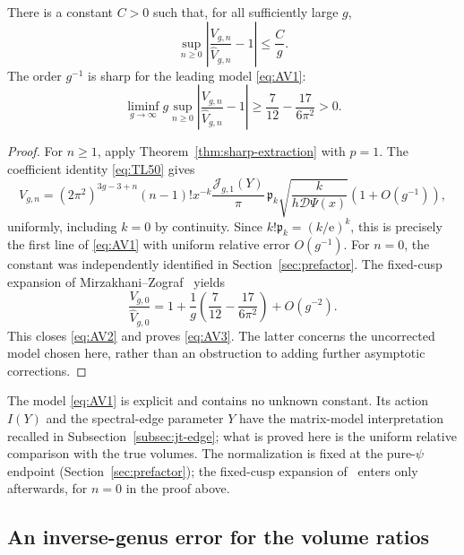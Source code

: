 \begin{theorem}\label{thm:absolute}
There is a constant $C>0$ such that, for all sufficiently large $g$,
\begin{equation}
 \sup_{n\ge0}\left|\frac{V_{g,n}}{\widehat V_{g,n}}-1\right|
       \le\frac Cg.
 \label{eq:AV2}
\end{equation}
The order $g^{-1}$ is sharp for the leading model \eqref{eq:AV1}:
\begin{equation}
 \liminf_{g\to\infty}g\sup_{n\ge0}
       \left|\frac{V_{g,n}}{\widehat V_{g,n}}-1\right|
       \ge\frac7{12}-\frac{17}{6\pi^2}>0.
 \label{eq:AV3}
\end{equation}
\end{theorem}
\begin{proof}
For $n\ge1$, apply Theorem~\ref{thm:sharp-extraction} with $p=1$.
The coefficient identity \eqref{eq:TL50} gives
\begin{equation}
 V_{g,n}=(2\pi^2)^{3g-3+n}(n-1)!x^{-k}
     \frac{\mathcal J_{g,1}(Y)}\pi\,
       \mathfrak p_k\sqrt{\frac{k}{h\mathscr D\Psi(x)}}
       (1+O(g^{-1})),
 \label{eq:AV4}
\end{equation}
uniformly, including $k=0$ by continuity.
Since $k!\mathfrak p_k=(k/\mathrm{e})^k$, this is precisely the first line of
\eqref{eq:AV1} with uniform relative error $O(g^{-1})$.
For $n=0$, the constant was independently identified in
Section~\ref{sec:prefactor}. The fixed-cusp expansion of
Mirzakhani--Zograf~\cite[Theorem~1.2 and Remark~1.3]{MZ} yields
\begin{equation}
 \frac{V_{g,0}}{\widehat V_{g,0}}
 =1+\frac1g\left(\frac7{12}-\frac{17}{6\pi^2}\right)+O(g^{-2}).
 \label{eq:AV5}
\end{equation}
This closes \eqref{eq:AV2} and proves \eqref{eq:AV3}.
The latter concerns the uncorrected model chosen here, rather than an
obstruction to adding further asymptotic corrections.
\end{proof}

The model \eqref{eq:AV1} is explicit and contains no unknown constant.
Its action $I(Y)$ and the spectral-edge parameter $Y$ have the
matrix-model interpretation recalled in Subsection~\ref{subsec:jt-edge};
what is proved here is the uniform relative comparison with the true
volumes. The normalization is fixed at the pure-$\psi$ endpoint
(Section~\ref{sec:prefactor}); the fixed-cusp expansion of~\cite{MZ}
enters only afterwards, for $n=0$ in the proof above.

\subsection{An inverse-genus error for the volume ratios}
\label{subsec:quantitative-volume-ratios}

